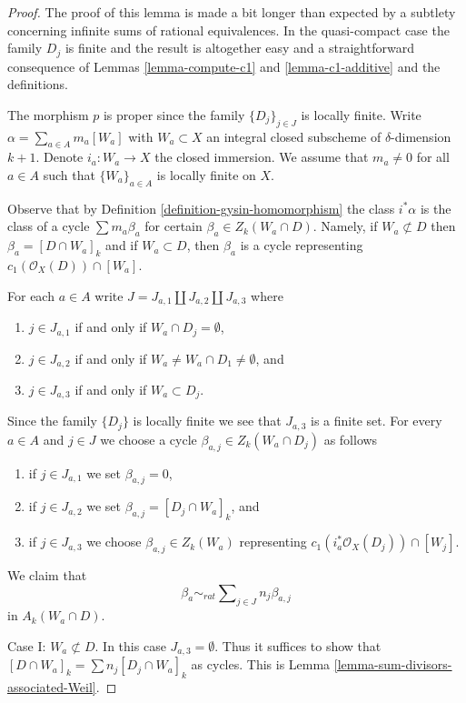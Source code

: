 \begin{proof}
The proof of this lemma is made a bit longer than expected
by a subtlety concerning infinite sums of rational equivalences.
In the quasi-compact case the family $D_j$ is finite and the result
is altogether easy and a straightforward consequence of
Lemmas \ref{lemma-compute-c1} and
\ref{lemma-c1-additive} and the definitions.

\medskip\noindent
The morphism $p$ is proper since the family $\{D_j\}_{j \in J}$
is locally finite. Write $\alpha = \sum_{a \in A} m_a [W_a]$
with $W_a \subset X$ an integral closed subscheme of
$\delta$-dimension $k + 1$.
Denote $i_a : W_a \to X$ the closed immersion.
We assume that $m_a \not = 0$ for all $a \in A$ such that
$\{W_a\}_{a \in A}$ is locally finite on $X$.

\medskip\noindent
Observe that
by Definition \ref{definition-gysin-homomorphism}
the class $i^*\alpha$ is the class of a cycle
$\sum m_a\beta_a$ for certain $\beta_a \in Z_k(W_a \cap D)$.
Namely, if $W_a \not \subset D$ then $\beta_a = [D \cap W_a]_k$
and if $W_a \subset D$, then $\beta_a$ is a cycle
representing $c_1(\mathcal{O}_X(D)) \cap [W_a]$.

\medskip\noindent
For each $a \in A$ write $J = J_{a, 1} \amalg J_{a, 2} \amalg J_{a, 3}$
where
\begin{enumerate}
\item $j \in J_{a, 1}$ if and only if $W_a \cap D_j = \emptyset$,
\item $j \in J_{a, 2}$ if and only if
$W_a \not = W_a \cap D_1 \not = \emptyset$, and
\item $j \in J_{a, 3}$ if and only if $W_a \subset D_j$.
\end{enumerate}
Since the family $\{D_j\}$ is locally finite we see that
$J_{a, 3}$ is a finite set. For every $a \in A$ and $j \in J$
we choose a cycle $\beta_{a, j} \in Z_k(W_a \cap D_j)$ as follows
\begin{enumerate}
\item if $j \in J_{a, 1}$ we set $\beta_{a, j} = 0$,
\item if $j \in J_{a, 2}$ we set $\beta_{a, j} = [D_j \cap W_a]_k$, and
\item if $j \in J_{a, 3}$ we choose $\beta_{a, j} \in Z_k(W_a)$
representing $c_1(i_a^*\mathcal{O}_X(D_j)) \cap [W_j]$.
\end{enumerate}
We claim that
$$
\beta_a \sim_{rat}
\sum\nolimits_{j \in J} n_j \beta_{a, j}
$$
in $A_k(W_a \cap D)$.

\medskip\noindent
Case I: $W_a \not \subset D$. In this case $J_{a, 3} = \emptyset$.
Thus it suffices to show that
$[D \cap W_a]_k = \sum n_j [D_j \cap W_a]_k$ as cycles.
This is Lemma \ref{lemma-sum-divisors-associated-Weil}.


\end{proof}
